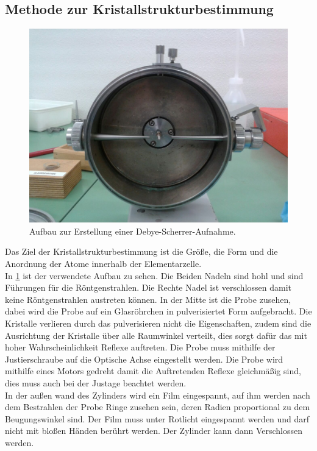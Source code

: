 \subsection{Methode zur Kristallstrukturbestimmung}
\FloatBarrier
\begin{figure}[h!]
	\centering
	\includegraphics[scale = 0.25]{../Grafiken/Aufbau.jpg}
	\caption{Aufbau zur Erstellung einer Debye-Scherrer-Aufnahme.}\label{fig:Aufbau}
\end{figure}
\FloatBarrier
Das Ziel der Kristallstrukturbestimmung ist die Größe, die Form und die Anordnung der Atome innerhalb der Elementarzelle.\\ 
In \cref{fig:Aufbau} ist der verwendete Aufbau zu sehen. Die Beiden Nadeln sind hohl und sind Führungen für die Röntgenstrahlen. Die Rechte Nadel ist verschlossen damit keine Röntgenstrahlen austreten können. In der Mitte ist die Probe zusehen, dabei wird die Probe auf ein Glasröhrchen in pulverisiertet Form aufgebracht. Die Kristalle verlieren durch das pulverisieren nicht die Eigenschaften, zudem sind die Ausrichtung der Kristalle über alle Raumwinkel verteilt, dies sorgt dafür das mit hoher Wahrscheinlichkeit Reflexe auftreten. Die Probe muss mithilfe der Justierschraube auf die Optische Achse eingestellt werden. Die Probe wird mithilfe eines Motors gedreht damit die Auftretenden Reflexe gleichmäßig sind, dies muss auch bei der Justage beachtet werden.\\
In der außen wand des Zylinders wird ein Film eingespannt, auf ihm werden nach dem Bestrahlen der Probe Ringe zusehen sein, deren Radien proportional zu dem Beugungswinkel sind. Der Film muss unter Rotlicht eingespannt werden und darf nicht mit bloßen Händen berührt werden. Der Zylinder kann dann Verschlossen werden.

